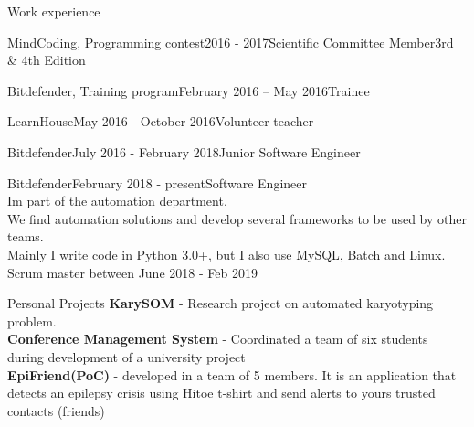 \documentclass{resume} %
\begin{document}
\begin{rSection}{Work experience}

    \begin{rSubsection}{MindCoding, Programming contest}{2016 - 2017}{Scientific Committee Member}{3rd \& 4th Edition}
    \end{rSubsection}

    \begin{rSubsection}{Bitdefender, Training program}{February 2016 – May 2016}{Trainee}{}
    \end{rSubsection}
    \begin{rSubsection}{LearnHouse}{May 2016 - October 2016}{Volunteer teacher}{}
    \end{rSubsection}
    \begin{rSubsection}{Bitdefender}{July 2016 - February 2018}{Junior Software Engineer}{}
    \end{rSubsection}
    \begin{rSubsection}{Bitdefender}{February 2018 - present}{Software Engineer}{\\I\textquotesingle m part of the automation department. \\We find automation solutions and develop several frameworks to be used by other teams. \\Mainly I write code in Python 3.0+, but I also use MySQL, Batch and Linux. \\ Scrum master between June 2018 - Feb 2019}
    \end{rSubsection}

\end{rSection}
\begin{rSection}{Personal Projects}
{\bf KarySOM} - Research project on automated karyotyping problem.\\
{\bf Conference Management System} - Coordinated a team of six students during development of a university project\\
{\bf EpiFriend(PoC)} - developed in a team of 5 members. It is an application that detects an epilepsy crisis using Hitoe t-shirt and send alerts to yours trusted contacts (friends)

\end{rSection}
\end{document}
